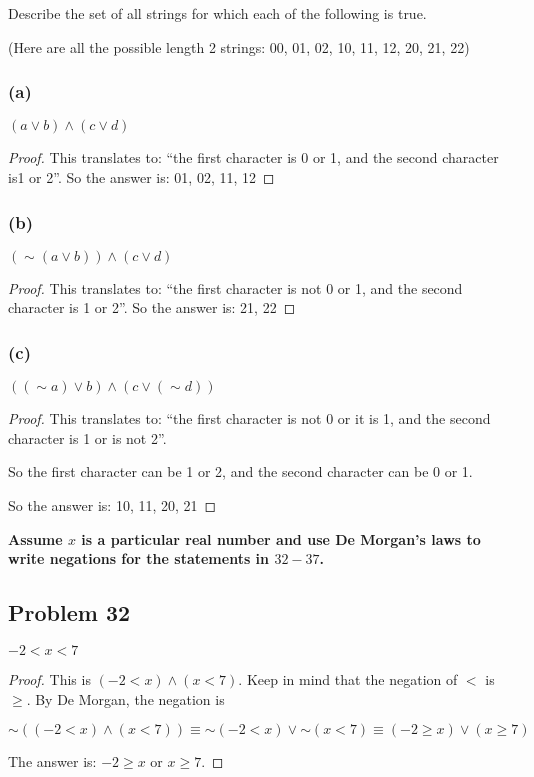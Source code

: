 \documentclass[14pt]{extarticle}
\begin{document}
Describe the set of all strings for which each of the following is true.

(Here are all the possible length 2 strings: 00, 01, 02, 10, 11, 12, 20, 21, 22)

\subsubsection{(a)}
$(a \vee b) \wedge (c \vee d)$

\begin{proof}
This translates to: ``the first character is 0 or 1, and the second character is1 or 2''. So the answer is: 01, 02, 11, 12
\end{proof}

\subsubsection{(b)}
$({\sim(a \vee b)}) \wedge (c \vee d)$

\begin{proof}
This translates to: ``the first character is not 0 or 1, and the second character is 1 or 2''. So the answer is: 21, 22
\end{proof}

\subsubsection{(c)}
$(({\sim a}) \vee b) \wedge (c \vee ({\sim d}))$

\begin{proof}
This translates to: ``the first character is not 0 or it is 1, and the second character is 1 or is not 2''.

So the first character can be 1 or 2, and the second character can be 0 or 1.

So the answer is: 10, 11, 20, 21
\end{proof}

{\bf Assume $x$ is a particular real number and use De Morgan’s laws to write negations for the statements in $32-37$.}

\subsection{Problem 32}
$-2 < x < 7$

\begin{proof}
This is $(-2 < x) \wedge (x < 7)$. Keep in mind that the negation of $<$ is $\geq$. By De Morgan, the negation is

$\sim((-2 < x) \wedge (x < 7)) \equiv {\sim(-2 < x)} \vee {\sim(x < 7)} \equiv (-2 \geq x) \vee (x \geq 7)$

The answer is: $-2 \geq x$ or $x \geq 7$.
\end{proof}
\end{document}
